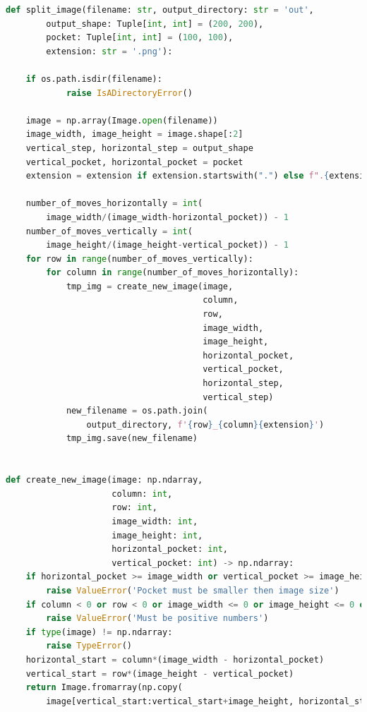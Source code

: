 \documentclass{article}
\begin{document}
\begin{lstlisting}[caption=Fragment skrytu dzielącego obrazy na mniejsze,language=Python]
def split_image(filename: str, output_directory: str = 'out',
        output_shape: Tuple[int, int] = (200, 200),
        pocket: Tuple[int, int] = (100, 100),
        extension: str = '.png'):

    if os.path.isdir(filename):
            raise IsADirectoryError()

    image = np.array(Image.open(filename))
    image_width, image_height = image.shape[:2]
    vertical_step, horizontal_step = output_shape
    vertical_pocket, horizontal_pocket = pocket
    extension = extension if extension.startswith(".") else f".{extension}"

    number_of_moves_horizontally = int(
        image_width/(image_width-horizontal_pocket)) - 1
    number_of_moves_vertically = int(
        image_height/(image_height-vertical_pocket)) - 1
    for row in range(number_of_moves_vertically):
        for column in range(number_of_moves_horizontally):
            tmp_img = create_new_image(image,
                                       column,
                                       row,
                                       image_width,
                                       image_height,
                                       horizontal_pocket,
                                       vertical_pocket,
                                       horizontal_step,
                                       vertical_step)
            new_filename = os.path.join(
                output_directory, f'{row}_{column}{extension}')
            tmp_img.save(new_filename)


def create_new_image(image: np.ndarray,
                     column: int,
                     row: int,
                     image_width: int,
                     image_height: int,
                     horizontal_pocket: int,
                     vertical_pocket: int) -> np.ndarray:
    if horizontal_pocket >= image_width or vertical_pocket >= image_height:
        raise ValueError('Pocket must be smaller then image size')
    if column < 0 or row < 0 or image_width <= 0 or image_height <= 0 or horizontal_pocket < 0 or vertical_pocket < 0:
        raise ValueError('Must be positive numbers')
    if type(image) != np.ndarray:
        raise TypeError()
    horizontal_start = column*(image_width - horizontal_pocket)
    vertical_start = row*(image_height - vertical_pocket)
    return Image.fromarray(np.copy(
        image[vertical_start:vertical_start+image_height, horizontal_start:horizontal_start+image_width]))
\end{lstlisting}
\end{document}
